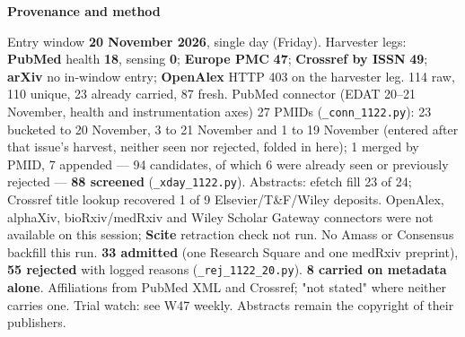 \documentclass[10pt]{article}
\begin{document}
\begin{keybox}
{\sffamily\bfseries\footnotesize\color{Deep}Provenance and method}\\[1.2mm]
{\fontsize{7.2}{8.8}\selectfont
Entry window \textbf{20 November 2026}, single day (Friday). Harvester legs: \textbf{PubMed} health \textbf{18}, sensing \textbf{0}; \textbf{Europe PMC} \textbf{47}; \textbf{Crossref by ISSN} \textbf{49}; \textbf{arXiv} no in-window entry; \textbf{OpenAlex} HTTP 403 on the harvester leg. 114 raw, 110 unique, 23 already carried, 87 fresh. PubMed connector (EDAT 20--21 November, health and instrumentation axes) 27 PMIDs (\texttt{\_conn\_1122.py}): 23 bucketed to 20 November, 3 to 21 November and 1 to 19 November (entered after that issue's harvest, neither seen nor rejected, folded in here); 1 merged by PMID, 7 appended --- 94 candidates, of which 6 were already seen or previously rejected --- \textbf{88 screened} (\texttt{\_xday\_1122.py}). Abstracts: efetch fill 23 of 24; Crossref title lookup recovered 1 of 9 Elsevier/T\&F/Wiley deposits.
OpenAlex, alphaXiv, bioRxiv/medRxiv and Wiley Scholar Gateway connectors were not available on this session; \textbf{Scite} retraction check not run. No Amass or Consensus backfill this run.
\textbf{33 admitted} (one Research Square and one medRxiv preprint), \textbf{55 rejected} with logged reasons (\texttt{\_rej\_1122\_20.py}). \textbf{8 carried on metadata alone}. Affiliations from PubMed XML and Crossref; "not stated" where neither carries one. Trial watch: see W47 weekly.
Abstracts remain the copyright of their publishers.\par}
\end{keybox}
\end{document}
